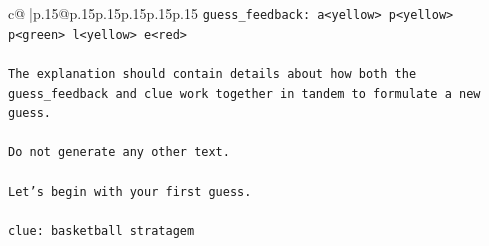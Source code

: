\documentclass{article}
\begin{document}
{\begin{supertabular}{c@{$\;$}|p{.15\linewidth}@{}p{.15\linewidth}p{.15\linewidth}p{.15\linewidth}p{.15\linewidth}p{.15\linewidth}}
{{{\texttt{guess\_feedback: a<yellow> p<yellow> p<green> l<yellow> e<red>} \\
\\ 
\texttt{The explanation should contain details about how both the guess\_feedback and clue work together in tandem to formulate a new guess.} \\
\\ 
\texttt{Do not generate any other text.} \\
\\ 
\texttt{Let's begin with your first guess.} \\
\\ 
\texttt{clue: basketball stratagem} \\
            }
        }
    }
     \\ \\


\end{supertabular}}
\end{document}
